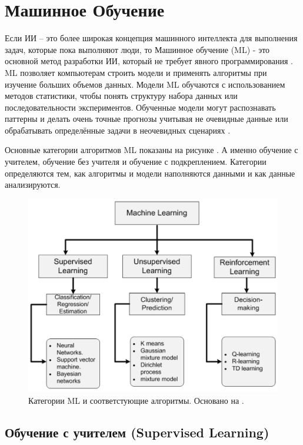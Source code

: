 \section{Машинное Обучение} \label{ch1:ml}

Если ИИ – это более широкая концепция машинного интеллекта для выполнения задач, которые пока выполняют люди, то Машинное обучение (ML) - это основной метод разработки ИИ, который не требует явного программирования \cite{Samuel-SomeStudies}. ML позволяет компьютерам строить модели и применять алгоритмы при изучение больших объемов данных. Модели ML обучаются с использованием методов статистики, чтобы понять структуру набора данных или последовательности экспериментов. Обученные модели могут распознавать паттерны и делать очень точные прогнозы учитывая не очевидные данные или обрабатывать определённые задачи в неочевидных сценариях \cite{bishop06pattern}.

Основные категории алгоритмов ML показаны на рисунке . А именно обучение с учителем, обучение без учителя и обучение с подкреплением.
Категории определяются тем, как алгоритмы и модели наполняются данными и как данные анализируются.

\begin{figure}[ht!] 
	\center
	\includegraphics [scale=0.60] {my_folder/images/ch1/ML-categories.png}
	\caption{Категории ML и соответстующие алгоритмы. Основано на \cite{Sultan_2018}.} 
	\label{fig:ch1-ML-categories}
\end{figure}


\subsection{Обучение с учителем (Supervised Learning)}

